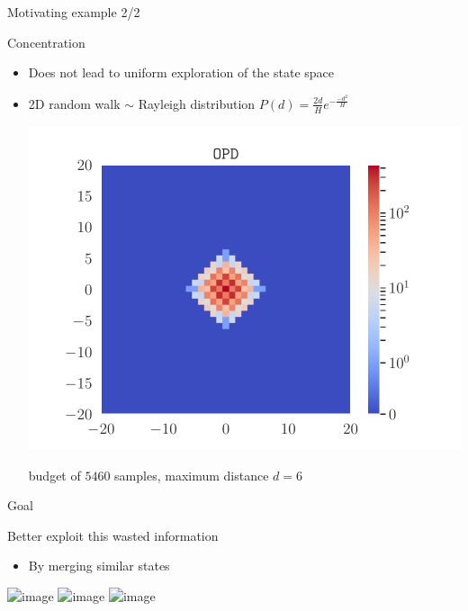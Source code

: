 \documentclass[slideopt,A4,showboxes,svgnames]{beamer}
\begin{document}
\begin{frame}{Motivating example 2/2}
\begin{alertblock}{Concentration}
\begin{itemize}[<+->]
\item Does not lead to uniform exploration of the state space
\item 2D random walk $\sim$ Rayleigh distribution
$P(d) = \frac{2d}{H}e^{-\frac{-d^2}{H}}$
\pause

\begin{center}
	\includegraphics[width=0.6\linewidth]{../img/occupations_OPD}
	
	budget of $5460$ samples, maximum distance $d=6$
\end{center}
\end{itemize}
\end{alertblock}
\end{frame}

\begin{frame}{Goal}
\begin{exampleblock}{Better exploit this wasted information}
	\begin{itemize}
		\item<2-4> By \alert{merging} similar states \only<3>{into a {\green graph}}
	\end{itemize}
	\begin{center}
		\includegraphics<1>[trim={1.8cm 2.2cm 1.9cm 2.7cm}, clip, width=0.55\linewidth]{img/tree_simple}%
		\includegraphics<2>[trim={1.8cm 2.2cm 1.9cm 2.7cm}, clip, width=0.55\linewidth]{img/tree_merging}%
		\includegraphics<3>[trim={1.8cm 2.2cm 1.9cm 2.7cm}, clip, width=0.55\linewidth]{img/tree_merged}%
	\end{center}
\end{exampleblock}
\end{frame}
\end{document}
